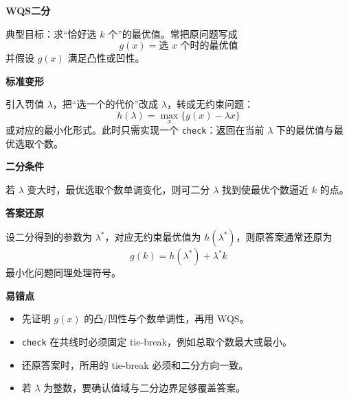 \textbf{WQS二分}

典型目标：求“恰好选 $k$ 个”的最优值。常把原问题写成
\[
g(x)=\text{选 }x\text{ 个时的最优值}
\]
并假设 $g(x)$ 满足凸性或凹性。

\textbf{标准变形}

引入罚值 $\lambda$，把“选一个的代价”改成 $\lambda$，转成无约束问题：
\[
h(\lambda)=\max_x \{g(x)-\lambda x\}
\]
或对应的最小化形式。此时只需实现一个 \texttt{check}：返回在当前 $\lambda$ 下的最优值与最优选取个数。

\textbf{二分条件}

若 $\lambda$ 变大时，最优选取个数单调变化，则可二分 $\lambda$ 找到使最优个数逼近 $k$ 的点。

\textbf{答案还原}

设二分得到的参数为 $\lambda^*$，对应无约束最优值为 $h(\lambda^*)$，则原答案通常还原为
\[
g(k)=h(\lambda^*)+\lambda^* k
\]
最小化问题同理处理符号。

\textbf{易错点}

\begin{itemize}
	\item 先证明 $g(x)$ 的凸/凹性与个数单调性，再用 WQS。
	\item \texttt{check} 在共线时必须固定 tie-break，例如总取个数最大或最小。
	\item 还原答案时，所用的 tie-break 必须和二分方向一致。
	\item 若 $\lambda$ 为整数，要确认值域与二分边界足够覆盖答案。
\end{itemize}
